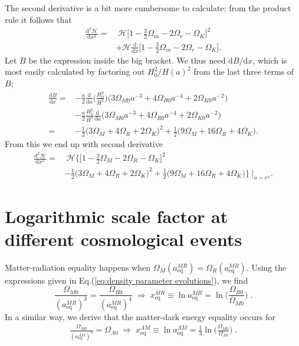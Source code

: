 \documentclass[twocolumn]{aa}
\renewcommand{\d}{\text{d}}
\newcommand{\dd}[2]{\frac{\d #1}{\d #2}}
\begin{document}
\begin{appendix}
The second derivative is a bit more cumbersome to calculate; from the product rule it follows that 
\begin{align*}
      \dd{^2\mathcal{H}}{x^2} =& \;\mathcal{H}\bigg[1- \frac{3}{2}\Omega_{m} -2\Omega_{r} - \Omega_K\bigg]^2\\
      &+ \mathcal{H}\dd{}{x}\bigg[1- \frac{3}{2}\Omega_{m} -2\Omega_{r} - \Omega_K\bigg].
\end{align*}
Let $B$ be the expression inside the big bracket. We thus need $\d B/\d x$, which is most easily calculated by factoring out $H_0^2/H(a)^2$ from the last three terms of $B$;
\begin{align*}
      \dd{B}{x} =& -\frac{a}{2}\dd{}{a}\Bigg(\frac{H_0^2}{H^2}\Bigg)\Big(3\Omega_{M0}a^{-3} + 4\Omega_{R0}a^{-4} + 2\Omega_{K0}a^{-2} \Big)\\
      &-\frac{a}{2}\frac{H_0^2}{H^2}\dd{}{a}\Big(3\Omega_{M0}a^{-3} + 4\Omega_{R0}a^{-4} + 2\Omega_{K0}a^{-2} \Big)\\[3mm]
      =& -\frac{1}{2}\Big(3\Omega_M +4\Omega_R +2\Omega_K\Big)^2 + \frac{1}{2}\Big(9\Omega_M + 16 \Omega_R + 4 \Omega_K\Big).
\end{align*}
From this we end up with second derivative
\begin{align*}
      \dd{^2\mathcal{H}}{x^2} =&\; \mathcal{H}\Bigg\{\bigg[1-\frac{3}{2}\Omega_M -2\Omega_R  -\Omega_K\bigg]^2\\
      & -\frac{1}{2}\Big(3\Omega_M + 4\Omega_R + 2\Omega_K \Big)^2+\frac{1}{2}\Big(9\Omega_M +16\Omega_R +4\Omega_K\Big)\Bigg\} \;\Bigg|_{a = e^x}.
\end{align*}
\section{Logarithmic scale factor at different cosmological events}
\label{appendix:cosmological events}

Matter-radiation equality happens when $\Omega_M(a^{MR}_\text{eq})=\Omega_R(a^{MR}_\text{eq})$. Using the expressions given in Eq.(\ref{eq:density parameter evolutions}), we find 
\begin{equation*}
      \frac{\Omega_{M0}}{(a^{MR}_\text{eq})^3} = \frac{\Omega_{R0}}{(a^{MR}_\text{eq})^4}\; \Rightarrow\; x^{MR}_\text{eq}\equiv \ln a^{MR}_\text{eq} = \ln\bigg(\frac{\Omega_{R0}}{\Omega_{M0}}\bigg)\;.
\end{equation*}
In a similar way, we derive that the matter-dark energy equality occurs for
\begin{align*}
      \frac{\Omega_{M0}}{(a^{\Lambda M}_\text{eq})^3} = \Omega_{\Lambda0}\; \Rightarrow\; x^{\Lambda M}_\text{eq}\equiv \ln a^{\Lambda M}_\text{eq} = \frac{1}{3}\ln\bigg(\frac{\Omega_{M0}}{\Omega_{\Lambda0}}\bigg)\;.
\end{align*}


\end{appendix}
\end{document}
